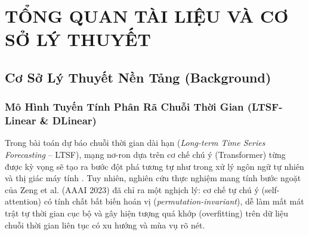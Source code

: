 \chapter{TỔNG QUAN TÀI LIỆU VÀ CƠ SỞ LÝ THUYẾT}
\label{ch:literature_review}

\section{Cơ Sở Lý Thuyết Nền Tảng (Background)}
\label{sec:background}

\subsection{Mô Hình Tuyến Tính Phân Rã Chuỗi Thời Gian (LTSF-Linear \& DLinear)}
Trong bài toán dự báo chuỗi thời gian dài hạn (\textit{Long-term Time Series Forecasting} -- LTSF), mạng nơ-ron dựa trên cơ chế chú ý (Transformer) từng được kỳ vọng sẽ tạo ra bước đột phá tương tự như trong xử lý ngôn ngữ tự nhiên và thị giác máy tính \cite{zhou2021informer, wu2021autoformer}. Tuy nhiên, nghiên cứu thực nghiệm mang tính bước ngoặt của Zeng et al. (AAAI 2023) \cite{zeng2023dlinear} đã chỉ ra một nghịch lý: cơ chế tự chú ý (self-attention) có tính chất bất biến hoán vị (\textit{permutation-invariant}), dễ làm mất mát trật tự thời gian cục bộ và gây hiện tượng quá khớp (overfitting) trên dữ liệu chuỗi thời gian liên tục có xu hướng và mùa vụ rõ nét.

